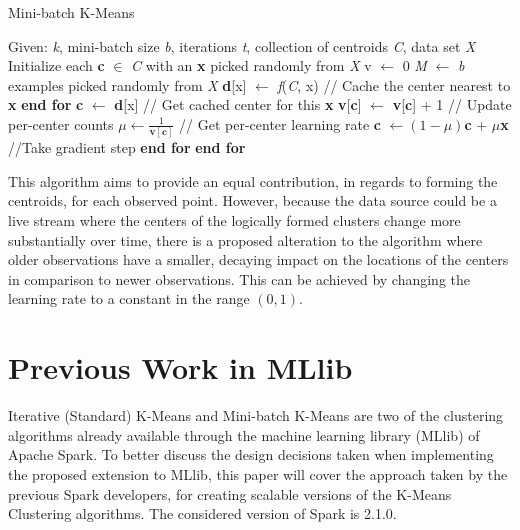 \documentclass{l4proj}
\begin{document}
\begin{algorithm}
\caption{Mini-batch K-Means}\label{mini-batch}
\begin{algorithmic}[1]
\State Given: \textit{k}, mini-batch size \textit{b}, iterations \textit{t}, collection of centroids \textit{C}, data set \textit{X}
\State Initialize each \textbf{c} $\in$ \textit{C} with an \textbf{x} picked randomly from \textit{X}
\State v $\gets$ 0
    \State \textit{M} $\gets$ \textit{b} examples picked randomly from \textit{X} 
    	\State \textbf{d}[x] $\gets$ \textit{f}(\textit{C}, x) \hspace{1cm} // Cache the center nearest to \textbf{x}
    \EndFor
    \State \textbf{end for}
    	\State \textbf{c} $\gets$ \textbf{d}[x] \hspace{1.5cm} // Get cached center for this \textbf{x}
        \State \textbf{v}[\textbf{c}] $\gets$ \textbf{v}[\textbf{c}] + 1 \hspace{0.5cm} // Update per-center counts
        \State $\mu \gets \frac{1}{\textbf{v}[\textbf{c}]}$ \hspace{1.5cm} // Get per-center learning rate
        \State \textbf{c} $\gets (1 - \mu)$\textbf{c} + $\mu$\textbf{x} \hspace{1cm} //Take gradient step
   \EndFor
   \State \textbf{end for}
\EndFor
\State \textbf{end for}
\end{algorithmic}
\end{algorithm}

This algorithm aims to provide an equal contribution, in regards to forming the centroids, for each observed point. However, because the data source could be a live stream where the centers of the logically formed clusters change more substantially over time, there is a proposed alteration to the algorithm where older observations have a smaller, decaying impact on the locations of the centers in comparison to newer observations\cite{Non-Stationary}. This can be achieved by changing the learning rate to a constant in the range $(0,1)$.


\chapter{Previous Work in MLlib}
\label{previous}

Iterative (Standard) K-Means and Mini-batch K-Means are two of the clustering algorithms already available through the machine learning library (MLlib) of Apache Spark. To better discuss the design decisions taken when implementing the proposed extension to MLlib, this paper will cover the approach taken by the previous Spark developers, for creating scalable versions of the K-Means Clustering algorithms. The considered version of Spark is 2.1.0.
\end{document}
